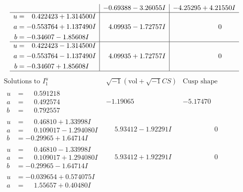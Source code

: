\documentclass[1p]{elsarticle_modified}
\theoremstyle{definition}
\newcommand{\I}{\sqrt{-1}}
\begin{document}
$$\begin{array}{c|c|c}
 & -0.69388 - 3.26055 I & -4.25295 + 4.21550 I \\ \hline\begin{aligned}
u &= \phantom{-}0.422423 + 1.314500 I \\
a &= -0.553764 + 1.137490 I \\
b &= -0.34607 - 1.85608 I\end{aligned}
 & \phantom{-}4.09935 - 1.72757 I & \phantom{-0.000000 } 0 \\ \hline\begin{aligned}
u &= \phantom{-}0.422423 - 1.314500 I \\
a &= -0.553764 - 1.137490 I \\
b &= -0.34607 + 1.85608 I\end{aligned}
 & \phantom{-}4.09935 + 1.72757 I & \phantom{-0.000000 } 0\\
 \hline 
 \end{array}$$\newpage$$\begin{array}{c|c|c}  
\text{Solutions to }I^u_{1}& \I (\text{vol} + \sqrt{-1}CS) & \text{Cusp shape}\\
 \hline 
\begin{aligned}
u &= \phantom{-}0.591218\phantom{ +0.000000I} \\
a &= \phantom{-}0.492574\phantom{ +0.000000I} \\
b &= \phantom{-}0.792557\phantom{ +0.000000I}\end{aligned}
 & -1.19065\phantom{ +0.000000I} & -5.17470\phantom{ +0.000000I} \\ \hline\begin{aligned}
u &= \phantom{-}0.46810 + 1.33998 I \\
a &= \phantom{-}0.109017 - 1.294080 I \\
b &= -0.29965 + 1.64714 I\end{aligned}
 & \phantom{-}5.93412 - 1.92291 I & \phantom{-0.000000 } 0 \\ \hline\begin{aligned}
u &= \phantom{-}0.46810 - 1.33998 I \\
a &= \phantom{-}0.109017 + 1.294080 I \\
b &= -0.29965 - 1.64714 I\end{aligned}
 & \phantom{-}5.93412 + 1.92291 I & \phantom{-0.000000 } 0 \\ \hline\begin{aligned}
u &= -0.039654 + 0.574075 I \\
a &= \phantom{-}1.55657 + 0.40480 I \\

\end{aligned}
\end{array}$$
\end{document}
